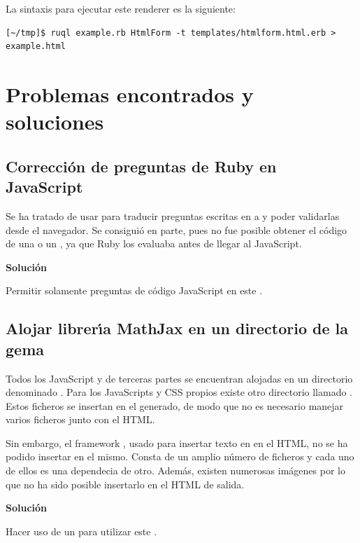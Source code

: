 La sintaxis para ejecutar este renderer es la siguiente:
\begin{verbatim}
[~/tmp]$ ruql example.rb HtmlForm -t templates/htmlform.html.erb > example.html
\end{verbatim}

\section{Problemas encontrados y soluciones}
\label{4:sec:1}

\subsection{Correcci\'on de preguntas de Ruby en JavaScript}
\label{subsec:4.1.2}
\bigskip

Se ha tratado de usar  para traducir preguntas escritas en  a  y poder validarlas desde el navegador.
Se consigui\'o en parte, pues no fue posible obtener el c\'odigo de una  o un , ya que Ruby los evaluaba antes de llegar al
JavaScript.
\bigskip

{\normalsize {\bfseries Soluci\'on}}
\bigskip

Permitir solamente preguntas de c\'odigo JavaScript en este .

\subsection{Alojar librer\'{\i}a MathJax en un directorio de la gema}
\label{subsec:4.1.3}
\bigskip

Todos los JavaScript y  de terceras partes se encuentran alojadas en un directorio denominado . Para los JavaScripts y CSS
propios existe otro directorio llamado . Estos ficheros se insertan en el  generado, de modo que no es necesario manejar varios
ficheros junto con el HTML. 

Sin embargo, el framework , usado para insertar texto en  en el HTML, no se ha podido insertar en el mismo. Consta de un
amplio n\'umero de ficheros y cada uno de ellos es una dependecia de otro. Adem\'as, existen numerosas im\'agenes por lo que no ha sido posible insertarlo
en el HTML de salida.
\bigskip

{\normalsize {\bfseries Soluci\'on}}
\bigskip

Hacer uso de un  para utilizar este .
